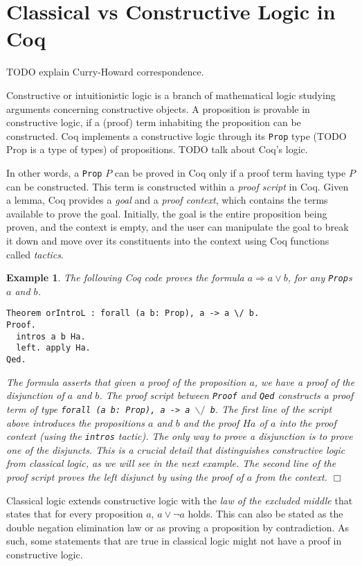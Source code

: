 \documentclass[11pt]{article}
\newtheorem{example}{Example}[section]
\begin{document}
	\section{Classical vs Constructive Logic in Coq}
	\label{sec:logic}
	TODO explain Curry-Howard correspondence.
	
	Constructive or intuitionistic logic 
	is a branch of mathematical logic 
	studying arguments concerning 
	constructive objects. A proposition 
	is provable in constructive logic, if 
	a (proof) term inhabiting the 
	proposition can be constructed. 
	Coq implements a constructive 
	logic through its \texttt{Prop}
	type (TODO Prop is a type of types) of propositions. 
	TODO talk about Coq's logic.
	
	In other words,
	a \texttt{Prop} $P$ can be proved in 
	Coq only if a proof term having 
	type $P$ can be constructed. 	
	This term is constructed within 
	a \textit{proof script} in Coq. 
	Given a lemma, Coq provides a \textit{goal} and 
	a \textit{proof context}, which 
	contains the 
	terms available to prove the goal.
	Initially, the goal is the entire 
	proposition being proven, and the 
	context is empty, and the user
	can manipulate the goal to break 
	it down and move over its 
	constituents into the context
	using Coq functions called 
	\textit{tactics}.
	
	\begin{example}
		\em The following Coq
		code proves the formula
		$a \Rightarrow a \lor b$, for any 
		\texttt{Prop}s $a$ and $b$. 		
	\begin{verbatim}
Theorem orIntroL : forall (a b: Prop), a -> a \/ b.
Proof.
  intros a b Ha.
  left. apply Ha.
Qed.
	\end{verbatim}
		The formula asserts that given a 
		proof of the proposition $a$, we
		have a proof of the 
		disjunction of $a$ and $b$.
		The proof script between 
		\texttt{Proof} 
		and \texttt{Qed} constructs a 
		proof term of type \texttt{forall 
		(a b: Prop), a -> a $\backslash/$ b}. 
		The first line of the 
		script above introduces 
		the propositions $a$ and $b$ and the 
		proof $Ha$ of $a$ into the 
		proof context (using the \texttt{intros}
		tactic). The only way to prove a 
		disjunction is to prove one 
		of the disjuncts. This is a crucial
		detail that distinguishes constructive
		logic from classical logic, as we 
		will see in the next example. 
		The second line of the proof script 
		proves the left disjunct by using 
		the proof of $a$ from the context.
		\hfill$\Box$
	\end{example}
	Classical logic extends 
	constructive logic with the 
	\textit{law of the excluded 
	middle} that states that for 
	every proposition $a$, 
	$a \lor \neg a$ holds. This can 
	also be stated as the 
	double negation elimination 
	law or as proving a 
	proposition by contradiction. As
	such, some statements that are true 
	in classical logic might not have 
	a proof in constructive logic.
	
\end{document}
